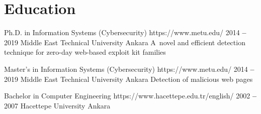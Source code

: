 
\section{Education}


    \itemizeCVBegin[nolabel]{}
    
        \bTitleYearOrgLinkPlace
            {Ph.D. in Information Systems (Cybersecurity)}
            {https://www.metu.edu/}
            {2014 \textbf{--} 2019}
            {Middle East Technical University}
            {Ankara}
            \small A~novel and efficient detection technique for zero-day web-based exploit kit families
            
        \bTitleYearOrgLinkPlace
            {Master’s in Information Systems (Cybersecurity)}
            {https://www.metu.edu/}
            {2014 \textbf{--} 2019}
            {Middle East Technical University}
            {Ankara}
            \small Detection of malicious web pages

        \bTitleYearOrgLinkPlace
            {Bachelor in Computer Engineering}
            {https://www.hacettepe.edu.tr/english/}
            {2002 \textbf{--} 2007}
            {Hacettepe University}
            {Ankara}
            
    \itemizeCVEnd
